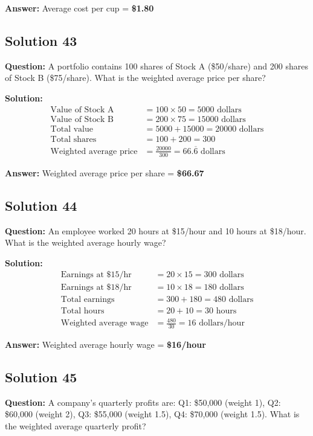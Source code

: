 \documentclass[12pt,a4paper]{article}
\begin{document}
\textbf{Answer:} Average cost per cup = \textbf{\$1.80}

\subsection*{Solution 43}
\textbf{Question:} A portfolio contains 100 shares of Stock A (\$50/share) and 200 shares of Stock B (\$75/share). What is the weighted average price per share?

\textbf{Solution:}
\begin{align*}
\text{Value of Stock A} &= 100 \times 50 = 5000 \text{ dollars} \\
\text{Value of Stock B} &= 200 \times 75 = 15000 \text{ dollars} \\
\text{Total value} &= 5000 + 15000 = 20000 \text{ dollars} \\
\text{Total shares} &= 100 + 200 = 300 \\
\text{Weighted average price} &= \frac{20000}{300} = 66.\overline{6} \text{ dollars}
\end{align*}

\textbf{Answer:} Weighted average price per share = \textbf{\$66.67}

\subsection*{Solution 44}
\textbf{Question:} An employee worked 20 hours at \$15/hour and 10 hours at \$18/hour. What is the weighted average hourly wage?

\textbf{Solution:}
\begin{align*}
\text{Earnings at } \$15/\text{hr} &= 20 \times 15 = 300 \text{ dollars} \\
\text{Earnings at } \$18/\text{hr} &= 10 \times 18 = 180 \text{ dollars} \\
\text{Total earnings} &= 300 + 180 = 480 \text{ dollars} \\
\text{Total hours} &= 20 + 10 = 30 \text{ hours} \\
\text{Weighted average wage} &= \frac{480}{30} = 16 \text{ dollars/hour}
\end{align*}

\textbf{Answer:} Weighted average hourly wage = \textbf{\$16/hour}

\subsection*{Solution 45}
\textbf{Question:} A company's quarterly profits are: Q1: \$50,000 (weight 1), Q2: \$60,000 (weight 2), Q3: \$55,000 (weight 1.5), Q4: \$70,000 (weight 1.5). What is the weighted average quarterly profit?
\end{document}
